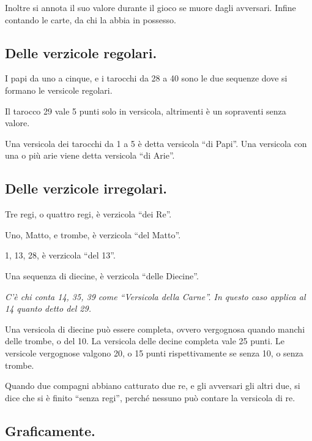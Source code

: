 \documentclass[11pt,a6paper]{article}
\begin{document}
Inoltre si annota il suo valore durante il gioco se muore dagli
avversari.  Infine contando le carte, da chi la abbia in possesso.

\subsection{Delle verzicole regolari.}

I papi da uno a cinque, e i tarocchi da 28 a 40 sono le due sequenze dove si
formano le versicole regolari.

Il tarocco 29 vale 5 punti solo in versicola, altrimenti è un sopraventi
senza valore.

Una versicola dei tarocchi da 1 a 5 è detta versicola ``di Papi''.  Una versicola
con una o più arie viene detta versicola ``di Arie''.

\subsection*{Delle verzicole irregolari.}

\begin{list}{\guilsinglright}{
  \setlength{\labelsep}{0pt}
  \setlength{\labelwidth}{9pt}
  \setlength{\topsep}{0pt}
  \setlength{\parsep}{0pt}
  \setlength{\parskip}{0pt}      
  \setlength{\itemsep}{0pt}
  \setlength{\leftmargin}{9pt}
  \setlength{\itemindent}{pt}
  \let\makelabel=\textbf}
\item Tre regi, o quattro regi, è verzicola ``dei Re''.
\item Uno, Matto, e trombe, è verzicola ``del Matto''. 
\item 1, 13, 28, è verzicola ``del 13''.
\item Una sequenza di diecine, è verzicola ``delle Diecine''.
\item \textit{C'è chi conta 14, 35, 39 come ``Versicola della Carne''. In questo caso applica al 14 quanto detto del 29.}
\end{list}

Una versicola di diecine può essere completa, ovvero vergognosa quando
manchi delle trombe, o del 10.  La versicola delle decine completa vale 25
punti.  Le versicole vergognose valgono 20, o 15 punti rispettivamente
se senza 10, o senza trombe.

Quando due compagni abbiano catturato due re, e gli avversari gli altri due,
si dice che si è finito ``senza regi'', perché nessuno può contare la
versicola di re.

\subsection{Graficamente.}
\end{document}
